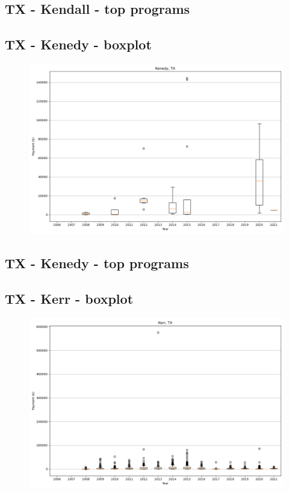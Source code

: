 \subsection*{TX - Kendall - top programs}

\newpage
\subsection*{TX - Kenedy - boxplot}
\begin{figure}[h]
\centering
\includegraphics[width=7in]{../output/boxplots/counties/Kenedy-TX_boxplot.png}
\end{figure}


\subsection*{TX - Kenedy - top programs}

\newpage
\subsection*{TX - Kerr - boxplot}
\begin{figure}[h]
\centering
\includegraphics[width=7in]{../output/boxplots/counties/Kerr-TX_boxplot.png}
\end{figure}


